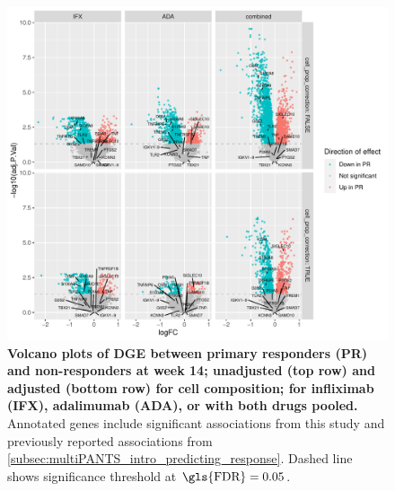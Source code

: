 \begin{figure}
    \centering
    \includegraphics[width=1.0\textwidth,page=1]{mainmatter/figures/chapter_04/plot_gene_set_enrichment.dge_result_volcano_simple_C_3RI_3NI,C_3RA_3NA,C_3R_3N.pdf}
    \caption[
    ]{
        \textbf{Volcano plots of \gls{DGE} between primary responders (PR) and non-responders at week 14; unadjusted (top row) and adjusted (bottom row) for cell composition; for infliximab (IFX), adalimumab (ADA), or with both drugs pooled.}
        Annotated genes include significant associations from this study and previously reported associations from \cref{subsec:multiPANTS_intro_predicting_response}.
        Dashed line shows significance threshold at $\text{\gls{FDR}} = 0.05$.
    }
    \label{fig:multipants_dge_volcano_week_14_R_N}
\end{figure}

